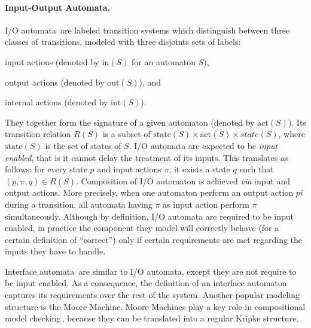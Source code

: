 \paragraph{Input-Output Automata.}
%
I/O automata\,\cite{lynch1988ioautomata} are labeled transition systems which
distinguish between three classes of transitions, modeled with three disjoints
sets of labels:
%
\begin{inparaenum}[(1)]
\item input actions (denoted by \( \mathrm{in}(S) \) for an automaton \( S \)),
\item output actions (denoted by \( \mathrm{out}(S) \)), and
\item internal actions (denoted by \( \mathrm{int}(S) \)).
\end{inparaenum}
%
They together form the signature of a given automaton (denoted by
\( \mathrm{act}(S) \)).
%
Its transition relation \( R(S) \) is a subset of
\( \mathrm{state}(S) \times \mathrm{act}(S) \times state(S) \), where
\( \mathrm{state}(S) \) is the set of states of \( S \).
%
I/O automata are expected to be \emph{input enabled}, that is it cannot delay
the treatment of its inputs.
%
This translates as follows: for every state \( p \) and input actions \( \pi \),
it exists a state \( q \) such that \( (p, \pi, q) \in R(S) \).
%
Composition of I/O automaton is achieved \emph{via} input and output actions.
%
More precisely, when one automaton perform an output action \( pi \) during a
transition, all automata having \( \pi \) as input action perform \( \pi \)
simultaneously.
%
Although by definition, I/O automata are required to be input enabled, in
practice the component they model will correctly behave (for a certain
definition of ``correct'') only if certain requirements are met regarding the
inputs they have to handle.

Interface automata\,\cite{de2001interfaceautomata} are similar to I/O automata,
except they are not require to be input enabled.
%
As a consequence, the definition of an interface automaton captures its
requirements over the rest of the system.
%
Another popular modeling structure is the Moore Machine.
%
Moore Machines play a key role in compositional model
checking\,\cite{mcmillan1989compositional}, because they can be translated into
a regular Kripke structure.

